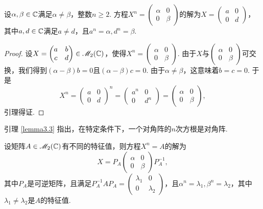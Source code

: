 \begin{lemma}

  设$\alpha,\beta\in\mathbb C$满足$\alpha\ne\beta$，整数$n\ge2$. 方程$X^n=\begin{pmatrix}
    \alpha & 0 \\
    0 & \beta
  \end{pmatrix}$的解为$X=\begin{pmatrix}
    a & 0 \\
    0 & d
  \end{pmatrix}$，其中$a,d\in\mathbb C$满足$a\ne d$，且$a^n=\alpha,d^n=\beta$.
\end{lemma}

\begin{proof}
  设$X=\begin{pmatrix}
    a & b \\
    c & d
  \end{pmatrix}\in\mathscr M_2(\mathbb C)$，使得$X^n=\begin{pmatrix}
    \alpha & 0 \\
    0 & \beta
  \end{pmatrix}$. 由于$X$与$\begin{pmatrix}
    \alpha & 0 \\
    0 & \beta
  \end{pmatrix}$可交换，我们得到$(\alpha-\beta)b=0$且$(\alpha-\beta)c=0$. 由于$\alpha\ne\beta$，这意味着$b=c=0$. 于是
  \[
    X^n = \begin{pmatrix}
      a & 0 \\
      0 & d
    \end{pmatrix}^n = \begin{pmatrix}
      a^n & 0 \\
      0 & d^n
    \end{pmatrix} =
    \begin{pmatrix}
      \alpha & 0 \\
      0 & \beta
    \end{pmatrix},
  \]
  引理得证.
\end{proof}

\begin{nota}
  引理 \ref{lemma3.3} 指出，在特定条件下，一个对角阵的$n$次方根是对角阵.
\end{nota}

\begin{theorem}[当$A$有不同特征值时的方程$X^n=A$.]

  设矩阵$A\in\mathscr M_2(\mathbb C)$有不同的特征值，则方程$X^n=A$的解为
  \[
    X = P_A\begin{pmatrix}
      \alpha & 0 \\
      0 & \beta
    \end{pmatrix} P_A^{-1},
  \]
  其中$P_A$是可逆矩阵，且满足$P_A^{-1}AP_A=\begin{pmatrix}
    \lambda_1 & 0 \\
    0 & \lambda_2
  \end{pmatrix}$，且$\alpha^n=\lambda_1,\beta^n=\lambda_2$，其中$\lambda_1\ne\lambda_2$是$A$的特征值.
\end{theorem}

